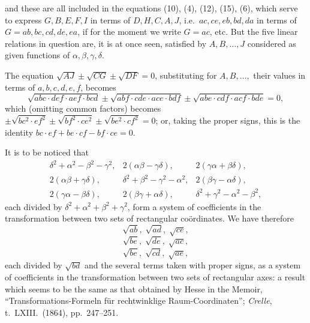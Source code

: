 \documentclass[11pt,a4paper]{article}
\begin{document}
\newpage


\noindent and these are all included in the equations (10), (4), (12), (15), (6), which serve to express $G, B, E, F, I$ in terms of $D, H, C, A, J$, i.e.\ $ac, ce, eb, bd, da$ in terms of $G = ab, bc, cd, de, ea$, if for the moment we write $G = ac$, etc. But the five linear relations in question are, it is at once seen, satisfied by $A, B, \ldots, J$ considered as given functions of $\alpha, \beta, \gamma, \delta$.

\medskip

The equation $\sqrt{AJ} \pm \sqrt{CG} \pm \sqrt{DF} = 0$, substituting for $A, B, \ldots,$ their values in terms of $a, b, c, d, e, f$, becomes
\[
\sqrt{abc \cdot def \cdot aef \cdot bcd} \pm \sqrt{abf \cdot cde \cdot ace \cdot bdf} \pm \sqrt{abe \cdot cdf \cdot acf \cdot bde} = 0,
\]
which (omitting common factors) becomes $\pm\sqrt{bc^{2} \cdot ef^{2}} \pm \sqrt{bf^{2} \cdot ce^{2}} \pm \sqrt{be^{2} \cdot cf^{2}} = 0$; or, taking the proper signs, this is the identity $bc \cdot ef + be \cdot cf - bf \cdot ce = 0$.

\medskip

It is to be noticed that
\[
\begin{array}{lll}
\delta^{2} + \alpha^{2} - \beta^{2} - \gamma^{2}, & 2(\alpha\beta - \gamma\delta), & 2(\gamma\alpha + \beta\delta),\\
2(\alpha\beta + \gamma\delta), & \delta^{2} + \beta^{2} - \gamma^{2} - \alpha^{2}, & 2(\beta\gamma - \alpha\delta),\\
2(\gamma\alpha - \beta\delta), & 2(\beta\gamma + \alpha\delta), & \delta^{2} + \gamma^{2} - \alpha^{2} - \beta^{2},
\end{array}
\]
each divided by $\delta^{2} + \alpha^{2} + \beta^{2} + \gamma^{2}$, form a system of coefficients in the transformation between two sets of rectangular co\"ordinates. We have therefore
\[
\sqrt{ab},\;\sqrt{ad},\;\sqrt{ce},
\]
\[
\sqrt{be},\;\sqrt{de},\;\sqrt{ac},
\]
\[
\sqrt{be},\;\sqrt{cd},\;\sqrt{ae},
\]
each divided by $\sqrt{bd}$ and the several terms taken with proper signs, as a system of coefficients in the transformation between two sets of rectangular axes: a result which seems to be the same as that obtained by Hesse in the Memoir, ``Transformations-Formeln f\"ur rechtwinklige Raum-Coordinaten''; \emph{Crelle}, t.~LXIII.\ (1864), pp.~247--251.

\medskip
\end{document}
